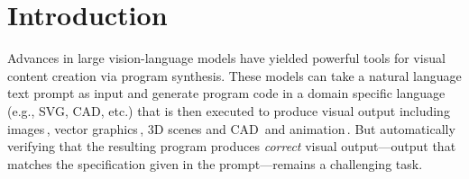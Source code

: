 \section{Introduction}
\label{sec:introduction}


Advances in large vision-language models have yielded
powerful tools for visual content creation via program synthesis.
%
These models can take a natural language text prompt as input and generate
program code in a domain specific language (e.g., SVG, CAD, etc.) that is then executed to
produce visual output including images\,\cite{gupta2023visprog}, vector
graphics\,\cite{xing2024llm4svg,polaczek2025neuralsvg},
3D scenes and CAD\,\cite{hu2025scenecraft,zhang2024scenelanguage,khan2024text2cadgeneration}
and animation\,\cite{gal2024breathing,tseng2024keyframer,liu2024logomotion}.
%
%
But automatically verifying that the resulting program produces 
{\em correct} visual output---output that matches the
specification given in the prompt---remains a challenging task.


